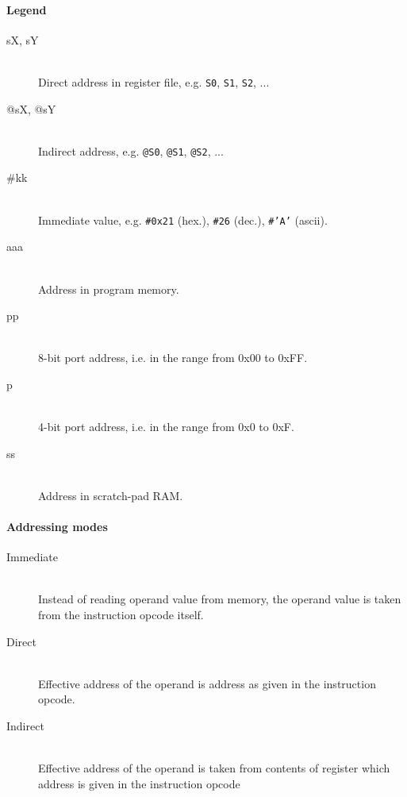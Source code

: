 \newcommand{\no}{\color{red}{\textbf{no}}}
\newcommand{\yes}{\color{black}{\textbf{yes}}}

\newcommand{\instruction}[1]{~\\[7pt]\addcontentsline{toc}{subsection}{#1}\colorbox{instruction_bg}{\parbox{\dimexpr\textwidth-2\fboxsep}{\color{black}\textbf{#1}}}\bigskip}

\paragraph{Legend}
    \begin{description}
        \item[sX, sY]~\\
            Direct address in register file, e.g. \texttt{S0}, \texttt{S1}, \texttt{S2}, ...
        \item[@sX, @sY]~\\
            Indirect address, e.g. \texttt{@S0}, \texttt{@S1}, \texttt{@S2}, ...
        \item[\#kk]~\\
            Immediate value, e.g. \texttt{\#0x21} (hex.), \texttt{\#26} (dec.), \texttt{\#'A'} (ascii).
        \item[aaa]~\\
            Address in program memory.
        \item[pp]~\\
            8-bit port address, i.e. in the range from 0x00 to 0xFF.
        \item[p]~\\
            4-bit port address, i.e. in the range from 0x0 to 0xF.
        \item[ss]~\\
            Address in scratch-pad RAM.
    \end{description}

\paragraph{Addressing modes}
    \begin{description}
        \item[Immediate]~\\
            Instead of reading operand value from memory, the operand value is taken from the instruction opcode itself.
        \item[Direct]~\\
            Effective address of the operand is address as given in the instruction opcode.
        \item[Indirect]~\\
            Effective address of the operand is taken from contents of register which address is given in the instruction opcode
    \end{description}

